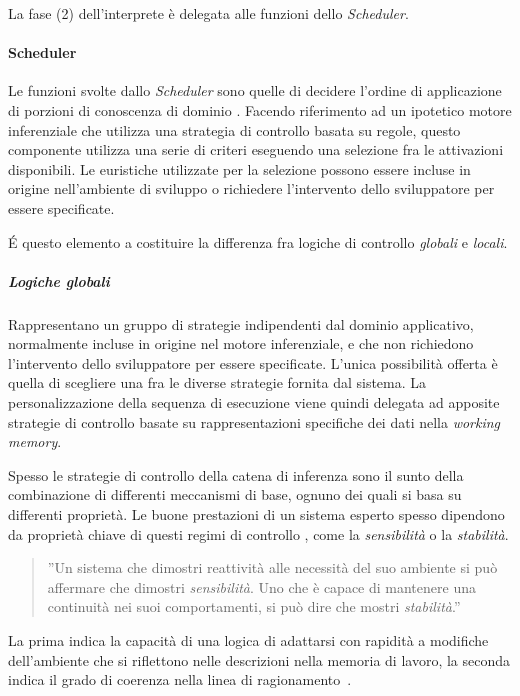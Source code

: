 La fase (2) dell'interprete è delegata alle funzioni dello \emph{Scheduler}. 

\paragraph{Scheduler} Le funzioni svolte dallo \emph{Scheduler} sono quelle di decidere l'ordine di applicazione di porzioni di conoscenza di dominio \cite{development1993}. Facendo riferimento ad un ipotetico motore inferenziale che utilizza una strategia di controllo basata su regole, questo componente utilizza una serie di criteri eseguendo una selezione fra le attivazioni disponibili. Le euristiche utilizzate per la selezione possono essere incluse in origine nell'ambiente di sviluppo o richiedere l'intervento dello sviluppatore per essere specificate.

\'E questo elemento a costituire la differenza fra logiche di controllo \emph{globali} e \emph{locali}. 

\subparagraph{Logiche globali} Rappresentano un gruppo di strategie indipendenti dal dominio applicativo, normalmente incluse in origine nel motore inferenziale, e che non richiedono l'intervento dello sviluppatore per essere specificate. L'unica possibilità offerta è quella di scegliere una fra le diverse strategie fornita dal sistema. La personalizzazione della sequenza di esecuzione viene quindi delegata ad apposite strategie di controllo basate su rappresentazioni specifiche dei dati nella \emph{working memory}.

Spesso le strategie di controllo della catena di inferenza sono il sunto della combinazione di differenti meccanismi di base, ognuno dei quali si basa su differenti proprietà. Le buone prestazioni di un sistema esperto spesso dipendono da proprietà chiave di questi regimi di controllo \cite{jackson1999}, come la \emph{sensibilità} o la \emph{stabilità}.
\begin{quote}
	''Un sistema che dimostri reattività alle necessità del suo ambiente si può affermare che dimostri \emph{sensibilità}. Uno che è capace di mantenere una continuità nei suoi comportamenti, si può dire che mostri \emph{stabilità}.''~\cite{McDermott:1977:PSC:1045343.1045364}
\end{quote} 
La prima indica la capacità di una logica di adattarsi con rapidità a modifiche dell'ambiente che si riflettono nelle descrizioni nella memoria di lavoro, la seconda indica il grado di coerenza nella linea di ragionamento~\cite{jackson1999}.

